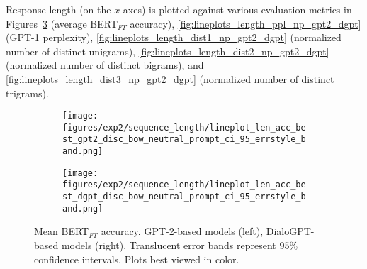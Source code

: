 Response length (on the $x$-axes) is plotted against various evaluation metrics in Figures~\ref{fig:lineplots_length_acc_np_gpt2_dgpt} (average BERT$_{FT}$ accuracy), \ref{fig:lineplots_length_ppl_np_gpt2_dgpt} (GPT-1 perplexity), \ref{fig:lineplots_length_dist1_np_gpt2_dgpt} (normalized number of distinct unigrams), \ref{fig:lineplots_length_dist2_np_gpt2_dgpt} (normalized number of distinct bigrams), and \ref{fig:lineplots_length_dist3_np_gpt2_dgpt} (normalized number of distinct trigrams).

    
    
    

\begin{figure}[H]
     \centering
     \begin{subfigure}[b]{0.49\textwidth}
        \centering
\texttt{[image: figures/exp2/sequence\_length/lineplot\_len\_acc\_best\_gpt2\_disc\_bow\_neutral\_prompt\_ci\_95\_errstyle\_band.png]}
        \caption{}
        \label{subfig:lineplot_length_acc_np_gpt2}
     \end{subfigure}
     \hfill
     \begin{subfigure}[b]{0.49\textwidth}
        \centering
        \texttt{[image: figures/exp2/sequence\_length/lineplot\_len\_acc\_best\_dgpt\_disc\_bow\_neutral\_prompt\_ci\_95\_errstyle\_band.png]}
        \caption{}
        \label{subfig:lineplot_length_acc_np_dgpt}
     \end{subfigure}
        \caption{Mean BERT$_{FT}$ accuracy. GPT-2-based models (left), DialoGPT-based models (right). Translucent error bands represent 95\% confidence intervals. Plots best viewed in color.}
        \label{fig:lineplots_length_acc_np_gpt2_dgpt}
\end{figure}

